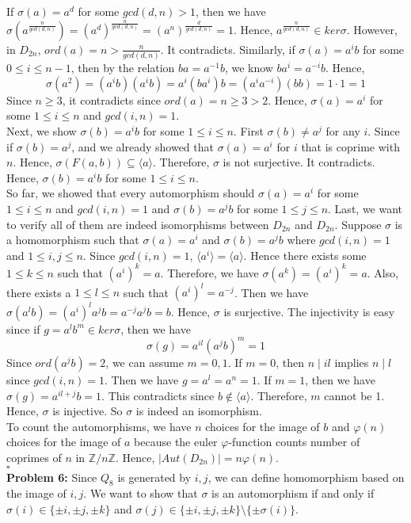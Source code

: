 \documentclass[12pt]{amsart}
\newcommand{\Z}{\mathbb{Z}}
\begin{document}
If $\sigma(a)=a^d$ for some $gcd(d,n)>1$, then we have $\sigma(a^{\frac{n}{gcd(d,n)}})=(a^d)^{\frac{n}{gcd(d,n)}}=(a^n)^{\frac{d}{gcd(d,n)}}=1$. Hence, $a^{\frac{n}{gcd(d,n)}}\in ker\sigma $. However, in $D_{2n}$, $ord(a)=n>\frac{n}{gcd(d,n)}$. It contradicts. Similarly, if $\sigma(a)=a^ib$ for some $0\leq i\leq n-1$, then by the relation $ba=a^{-1}b$, we know $ba^i=a^{-i}b$. Hence, 
\[\sigma(a^2)=(a^ib)(a^ib)=a^i(ba^i)b=(a^ia^{-i})(bb)=1\cdot 1=1\]
Since $n\geq 3$, it contradicts since $ord(a)=n\geq 3>2$.
Hence, $\sigma(a)=a^i$ for some $1\leq i\leq n$ and $gcd(i,n)=1$.\\
Next, we show $\sigma(b)=a^{i}b$ for some $1\leq i\leq n$. First $\sigma(b)\neq a^j$ for any $i$. Since if $\sigma(b)=a^j$, and we already showed that $\sigma(a)=a^i$ for $i$ that is coprime with $n$. Hence, $\sigma(F(a,b))\subseteq \langle a\rangle$. Therefore, $\sigma$ is not surjective. It contradicts. Hence, $\sigma(b)=a^ib$ for some $1\leq i\leq n$.\\
So far, we showed that every automorphism should $\sigma(a)=a^i$ for some $1\leq i\leq n$ and $gcd(i,n)=1$ and $\sigma(b)=a^jb$ for some $1\leq j\leq n$. Last, we want to verify all of them are indeed isomorphisms between $D_{2n}$ and $D_{2n}$. Suppose $\sigma$ is a homomorphism such that $\sigma(a)=a^i$ and $\sigma(b)=a^jb$ where $gcd(i,n)=1$ and $1\leq i,j\leq n$. Since $gcd(i,n)=1$, $\langle a^i\rangle=\langle a\rangle$. Hence there exists some $1\leq k\leq n$ such that $(a^i)^k=a$. Therefore, we have $\sigma(a^k)=(a^i)^k=a$. Also, there exists a $1\leq l\leq n$ such that $(a^i)^l=a^{-j}$. Then we have 
$\sigma(a^lb)=(a^{i})^la^jb=a^{-j}a^jb=b$. Hence, $\sigma$ is surjective. 
The injectivity is easy since if $g=a^lb^m\in ker\sigma$, then we have 
\[\sigma(g)=a^{il}(a^jb)^m=1\]
Since $ord(a^jb)=2$, we can assume $m=0,1$. If $m=0$, then $n\mid il$ implies $n\mid l$ since $gcd(i,n)=1$. Then we have $g=a^l=a^n=1$. If $m=1$, then we have $\sigma(g)=a^{il+j}b=1$. This contradicts since $b\notin \langle a\rangle$. Therefore, $m$ cannot be 1. Hence, $\sigma$ is injective. So $\sigma$ is indeed an isomorphism.\\
To count the automorphisms, we have $n$ choices for the image of $b$ and $\varphi(n)$ choices for the image of $a$ because the euler $\varphi$-function counts number of coprimes of $n$ in $\Z/n\Z$. Hence, $|Aut(D_{2n})|=n\varphi(n)$. 
\\\phantom{qed}\hfill$\square$\\
\textbf{Problem 6:} Since $Q_8$ is generated by $i,j$, we can define homomorphism based on the image of $i,j$. We want to show that $\sigma$ is an automorphism if and only if $\sigma(i)\in \{\pm i,\pm j,\pm k\}$ and $\sigma(j)\in \{\pm i,\pm j,\pm k\}\setminus \{\pm \sigma(i)\}$.\\
\end{document}
